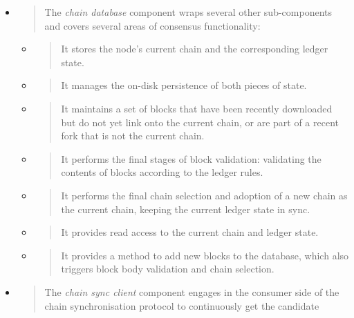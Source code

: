 \documentclass[11pt,a4paper]{article}
\begin{document}
\begin{itemize}
\item
  \begin{quote}
  The \emph{chain database} component wraps several other sub-components
  and covers several areas of consensus functionality:
  \end{quote}

  \begin{itemize}
  \item
    \begin{quote}
    It stores the node's current chain and the corresponding ledger
    state.
    \end{quote}
  \item
    \begin{quote}
    It manages the on-disk persistence of both pieces of state.
    \end{quote}
  \item
    \begin{quote}
    It maintains a set of blocks that have been recently downloaded but
    do not yet link onto the current chain, or are part of a recent fork
    that is not the current chain.
    \end{quote}
  \item
    \begin{quote}
    It performs the final stages of block validation: validating the
    contents of blocks according to the ledger rules.
    \end{quote}
  \item
    \begin{quote}
    It performs the final chain selection and adoption of a new chain as
    the current chain, keeping the current ledger state in sync.
    \end{quote}
  \item
    \begin{quote}
    It provides read access to the current chain and ledger state.
    \end{quote}
  \item
    \begin{quote}
    It provides a method to add new blocks to the database, which also
    triggers block body validation and chain selection.
    \end{quote}
  \end{itemize}
\item
  \begin{quote}
  The \emph{chain sync client} component engages in the consumer side of
  the chain synchronisation protocol to continuously get the candidate

\end{quote}
\end{itemize}
\end{document}
